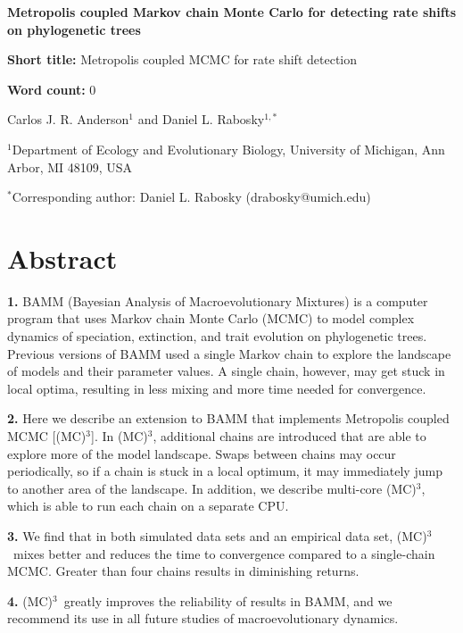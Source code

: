 \documentclass[12pt]{article}
\newcommand{\MCMCMC}{(MC)$^{3}$}
\begin{document}
\baselineskip 24pt

\begin{flushleft}

{\Large\textbf{Metropolis coupled Markov chain Monte Carlo
    for detecting rate shifts on phylogenetic trees}}

\textbf{Short title:} Metropolis coupled MCMC for rate shift detection

\textbf{Word count:} 0

Carlos J. R. Anderson$^{1}$ and
Daniel L. Rabosky$^{1,*}$

$^{1}$Department of Ecology and Evolutionary Biology,
    University of Michigan, Ann Arbor, MI 48109, USA

$^{*}$Corresponding author: Daniel L. Rabosky (drabosky@umich.edu)

\end{flushleft}


\pagebreak[4]


\section*{Abstract}

{\setlength{\parindent}{0cm}

\textbf{1.}
BAMM (Bayesian Analysis of Macroevolutionary Mixtures) is a computer program
that uses Markov chain Monte Carlo (MCMC) to model complex dynamics
of speciation, extinction, and trait evolution on phylogenetic trees.
%
Previous versions of BAMM used a single Markov chain
to explore the landscape of models and their parameter values.
%
A single chain, however, may get stuck in local optima,
resulting in less mixing and more time needed for convergence.

\textbf{2.}
Here we describe an extension to BAMM
that implements Metropolis coupled MCMC [\MCMCMC].
%
In \MCMCMC, additional chains are introduced
that are able to explore more of the model landscape.
%
Swaps between chains may occur periodically,
so if a chain is stuck in a local optimum,
it may immediately jump to another area of the landscape.
%
In addition, we describe multi-core \MCMCMC,
which is able to run each chain on a separate CPU.

\textbf{3.}
We find that in both simulated data sets and an empirical data set,
\MCMCMC\ mixes better and reduces the time to convergence
compared to a single-chain MCMC.
%
Greater than four chains results in diminishing returns.

\textbf{4.}
\MCMCMC\ greatly improves the reliability of results in BAMM,
and we recommend its use in all future studies of macroevolutionary dynamics.
}
\end{document}
